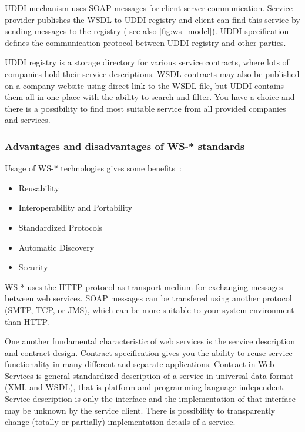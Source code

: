 \gls{UDDI} mechanism uses \gls{SOAP} messages for client-server communication. 
Service provider publishes the \gls{WSDL} to \gls{UDDI} registry and client can
find this service by sending messages to the registry ( see also 
\autoref{fig:ws_model}). \gls{UDDI} specification defines the communication
protocol between \gls{UDDI} registry and other parties.


\gls{UDDI} registry is a storage directory for various service contracts, where
lots of companies hold their service descriptions. \gls{WSDL} contracts may 
also be published on a company website using direct link to the \gls{WSDL} file,
but \gls{UDDI} contains them all in one place with the ability to search and
filter.
You have a choice and there is a possibility to find most suitable service
from all provided companies and services.



\subsubsection{Advantages and disadvantages of WS-* standards}
Usage of WS-* technologies gives some
benefits~\cite{ws_techologies_state_of_the_art}:

\begin{itemize}
  \item Reusability
  \item Interoperability and Portability
  \item Standardized Protocols
  \item Automatic Discovery
  \item Security
\end{itemize}

WS-* uses the \gls{HTTP} protocol as transport medium for exchanging messages
between web services. \gls{SOAP} messages can be transfered using another
protocol (\gls{SMTP}, \gls{TCP}, or \gls{JMS}), which can be more suitable to
your system environment than \gls{HTTP}.

One another fundamental characteristic of web services is the service
description and contract design. Contract specification gives you the ability to
reuse service functionality in many different and separate applications.
Contract in Web Services is general standardized description of a service in
universal data format (\gls{XML} and \gls{WSDL}), that is platform and programming language
independent. Service description is only the interface and the implementation
of that interface may be unknown by the service client. There is possibility to
transparently change (totally or partially) implementation details of a service.


